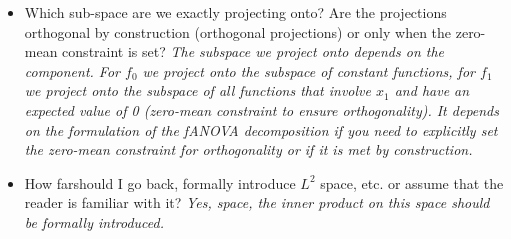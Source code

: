 \begin{itemize}
    \item Which sub-space are we exactly projecting onto? Are the projections orthogonal by construction (orthogonal projections) or only when the zero-mean constraint is set? \textit{The subspace we project onto depends on the component. For $f_0$ we project onto the subspace of constant functions, for $f_1$ we project onto the subspace of all functions that involve $x_1$ and have an expected value of 0 (zero-mean constraint to ensure orthogonality). It depends on the formulation of the fANOVA decomposition if you need to explicitly set the zero-mean constraint for orthogonality or if it is met by construction.}
    \item How \ldq far\rdq should I go back, formally introduce $L^2$ space, etc. or assume that the reader is familiar with it? \textit{Yes, space, the inner product on this space should be formally introduced.}
\end{itemize}




